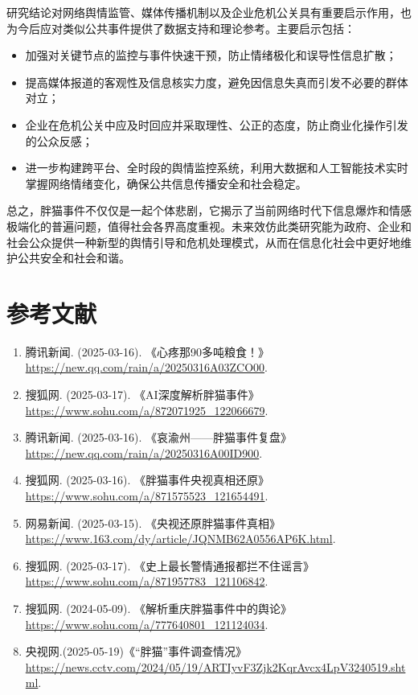 \documentclass{article}
\begin{document}
研究结论对网络舆情监管、媒体传播机制以及企业危机公关具有重要启示作用，也为今后应对类似公共事件提供了数据支持和理论参考。主要启示包括：
\begin{itemize}
    \item 加强对关键节点的监控与事件快速干预，防止情绪极化和误导性信息扩散；
    \item 提高媒体报道的客观性及信息核实力度，避免因信息失真而引发不必要的群体对立；
    \item 企业在危机公关中应及时回应并采取理性、公正的态度，防止商业化操作引发的公众反感；
    \item 进一步构建跨平台、全时段的舆情监控系统，利用大数据和人工智能技术实时掌握网络情绪变化，确保公共信息传播安全和社会稳定。
\end{itemize}
总之，胖猫事件不仅仅是一起个体悲剧，它揭示了当前网络时代下信息爆炸和情感极端化的普遍问题，值得社会各界高度重视。未来效仿此类研究能为政府、企业和社会公众提供一种新型的舆情引导和危机处理模式，从而在信息化社会中更好地维护公共安全和社会和谐。

\section*{参考文献}
\begin{enumerate}
    \item 腾讯新闻. (2025-03-16). 《心疼那90多吨粮食！》\url{https://new.qq.com/rain/a/20250316A03ZCO00}.
    \item 搜狐网. (2025-03-17). 《AI深度解析胖猫事件》\url{https://www.sohu.com/a/872071925_122066679}.
    \item 腾讯新闻. (2025-03-16). 《哀渝州——胖猫事件复盘》\url{https://new.qq.com/rain/a/20250316A00ID900}.
    \item 搜狐网. (2025-03-16). 《胖猫事件央视真相还原》\url{https://www.sohu.com/a/871575523_121654491}.
    \item 网易新闻. (2025-03-15). 《央视还原胖猫事件真相》\url{https://www.163.com/dy/article/JQNMB62A0556AP6K.html}.
    \item 搜狐网. (2025-03-17). 《史上最长警情通报都拦不住谣言》\url{https://www.sohu.com/a/871957783_121106842}.
    \item 搜狐网. (2024-05-09). 《解析重庆胖猫事件中的舆论》\url{https://www.sohu.com/a/777640801_121124034}.
    \item 央视网.(2025-05-19)《“胖猫”事件调查情况》
    \url{https://news.cctv.com/2024/05/19/ARTIyvF3Zjk2KqrAvcx4LpV3240519.shtml}.
\end{enumerate}
\end{document}
